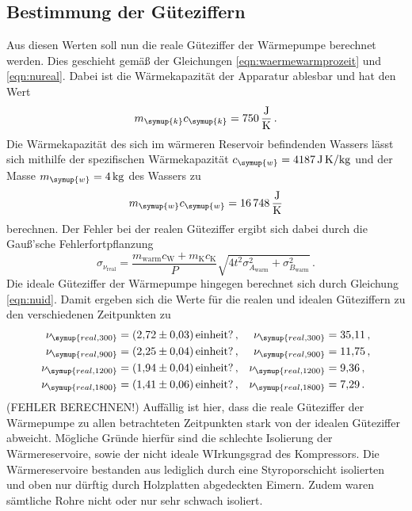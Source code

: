 \subsection{Bestimmung der Güteziffern}

Aus diesen Werten soll nun die reale Güteziffer der Wärmepumpe berechnet werden. Dies geschieht gemäß der Gleichungen
\ref{eqn:waermewarmprozeit} und \ref{eqn:nureal}. Dabei ist die Wärmekapazität
der Apparatur ablesbar und hat den Wert
\begin{equation}
  m_{\symup{k}}c_{\symup{k}}=\SI{750}{\joule\per\kelvin} \,. \nonumber
\end{equation}
Die Wärmekapazität des sich im wärmeren Reservoir befindenden Wassers lässt sich
mithilfe der spezifischen Wärmekapazität $c_{\symup{w}}=\SI{4187}{\joule\per\kilo\gram\kelvin}$
und der Masse $m_{\symup{w}}=\SI{4}{\kilo\gram}$ des Wassers zu
\begin{equation}
  m_{\symup{w}}c_{\symup{w}}=\SI{16748}{\joule\per\kelvin}  \nonumber
\end{equation}
berechnen.
Der Fehler bei der realen Güteziffer ergibt sich dabei durch die Gauß'sche Fehlerfortpflanzung
\begin{equation}
  \sigma_{\nu_\text{real}} = \frac{m_\text{warm} c_\text{W} + m_\text{K} c_\text{K}}{P}
  \sqrt{4 t^2 \sigma_{A_\text{warm}}^2 + \sigma_{B_\text{warm}}^2} \,.
\end{equation}
Die ideale Güteziffer der Wärmepumpe hingegen berechnet sich durch Gleichung
\ref{eqn:nuid}. Damit ergeben sich die Werte für die realen und idealen
Güteziffern zu den verschiedenen Zeitpunkten zu
\begin{align*}
  \nu_{\symup{real, 300}} &= \SI{2.72(003)}{einheit?} \,, & \nu_{\symup{real, 300}} &= \SI{35.11}{...}  \,,\\
  \nu_{\symup{real, 900}} &= \SI{2.25(004)}{einheit?} \,, & \nu_{\symup{real, 900}} &= \SI{11.75}{}  \,,\\
  \nu_{\symup{real, 1200}} &= \SI{1.94(004)}{einheit?} \,,& \nu_{\symup{real, 1200}} &= \SI{9.36}{}  \,,\\
  \nu_{\symup{real, 1800}} &=  \SI{1.41(006)}{einheit?}\,,& \nu_{\symup{real, 1800}} &= \SI{7.29}{}  \,.\\
\end{align*}
(FEHLER BERECHNEN!)
Auffällig ist hier, dass die reale Güteziffer der Wärmepumpe zu allen betrachteten
Zeitpunkten stark von der idealen Güteziffer abweicht.
Mögliche Gründe hierfür sind die schlechte Isolierung der Wärmereservoire, sowie
der nicht ideale WIrkungsgrad des Kompressors. Die Wärmereservoire bestanden
aus lediglich durch eine Styroporschicht isolierten und oben nur dürftig durch Holzplatten
abgedeckten Eimern. Zudem waren sämtliche Rohre nicht oder nur sehr schwach isoliert.

